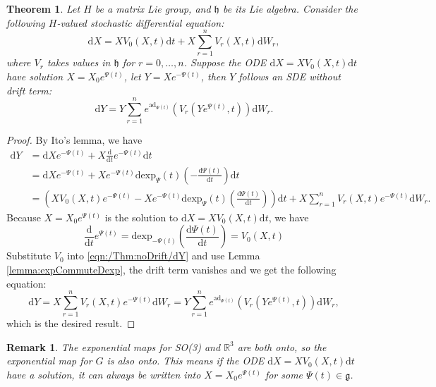 \documentclass[10pt]{article}
\newtheorem{theorem}{Theorem}
\newtheorem{remark}{Remark}
\begin{document}
\begin{theorem} \label{thm:noDrift}
	Let $H$ be a matrix Lie group, and $\mathfrak{h}$ be its Lie algebra.
	Consider the following $H$-valued stochastic differential equation:
	\begin{equation}
		\mathrm{d}X = XV_0(X,t)\mathrm{d}t + X\sum_{r=1}^nV_r(X,t)\mathrm{d}W_r,
	\end{equation}
	where $V_r$ takes values in $\mathfrak{h}$ for $r=0,\ldots,n$.
	Suppose the ODE $\mathrm{d}X=XV_0(X,t)\mathrm{d}t$ have solution $X=X_0e^{\Psi(t)}$,
	let $Y=Xe^{-\Psi(t)}$, then $Y$ follows an SDE without drift term:
	\begin{equation}
		\mathrm{d}Y = Y\sum_{r=1}^ne^{\mathrm{ad}_{\Psi(t)}}\left(V_r(Ye^{\Psi(t)},t)\right)\mathrm{d}W_r.
	\end{equation}
\end{theorem}
\begin{proof}
	By Ito's lemma, we have
	\begin{align} \label{eqn:/Thm:noDrift/dY}
		\mathrm{d}Y &= \mathrm{d}Xe^{-\Psi(t)} + X\frac{\mathrm{d}}{\mathrm{d}t}e^{-\Psi(t)}\mathrm{d}t \nonumber \\
		&= \mathrm{d}Xe^{-\Psi(t)} + Xe^{-\Psi(t)}\mathrm{dexp}_\Psi(t)\left(-\frac{\mathrm{d}\Psi(t)}{\mathrm{d}t}\right)\mathrm{d}t \nonumber \\
		&= \left(XV_0(X,t)e^{-\Psi(t)}-Xe^{-\Psi(t)}\mathrm{dexp}_\Psi(t)\left(\frac{\mathrm{d}\Psi(t)}{\mathrm{d}t}\right)\right)\mathrm{d}t + X\sum_{r=1}^nV_r(X,t)e^{-\Psi(t)}\mathrm{d}W_r.
	\end{align}
	Because $X=X_0e^{\Psi(t)}$ is the solution to $\mathrm{d}X=XV_0(X,t)\mathrm{d}t$, we have
	\begin{equation}
		\frac{\mathrm{d}}{\mathrm{d}t}e^{\Psi(t)} = \mathrm{dexp}_{-\Psi(t)}\left(\frac{\mathrm{d}\Psi(t)}{\mathrm{d}t}\right) = V_0(X,t)
	\end{equation}
	Substitute $V_0$ into \eqref{eqn:/Thm:noDrift/dY} and use Lemma \ref{lemma:expCommuteDexp}, the drift term vanishes and we get the following equation:
	\begin{equation}
		\mathrm{d}Y = X\sum_{r=1}^nV_r(X,t)e^{-\Psi(t)}\mathrm{d}W_r = Y\sum_{r=1}^ne^{\mathrm{ad}_{\Psi(t)}}\left(V_r(Ye^{\Psi(t)},t)\right)\mathrm{d}W_r,
	\end{equation}
	which is the desired result.
\end{proof}

\begin{remark}
	The exponential maps for SO(3) and $\mathbb{R}^3$ are both onto, so the exponential map for $G$ is also onto.
	This means if the ODE $\mathrm{d}X=XV_0(X,t)\mathrm{d}t$ have a solution, it can always be written into $X=X_0e^{\Psi(t)}$ for some $\Psi(t)\in\mathfrak{g}$.
\end{remark}
\end{document}
